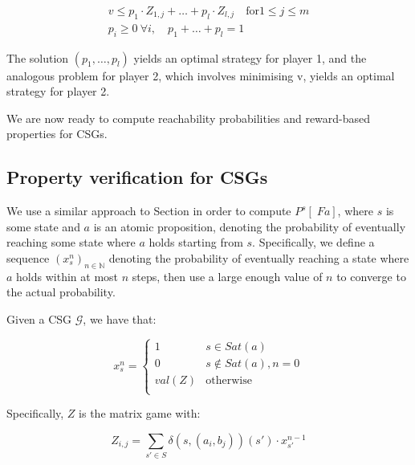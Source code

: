 \begin{align*}
v \leq p_1 \cdot Z_{1, j} + \dots + p_l \cdot Z_{l, j} \quad \text{for} 1 \leq j \leq m \\
p_i \geq 0 \: \forall i, \quad p_1 + \dots + p_l = 1
\end{align*}

The solution $(p_1, \dots, p_l)$ yields an optimal strategy for player 1, and the analogous problem for player 2, which involves minimising v, yields an optimal strategy for player 2.

We are now ready to compute reachability probabilities and reward-based properties for CSGs.

\subsection{Property verification for CSGs}
\label{cs3:prop_ver_csgs}

We use a similar approach to Section \label{cs1:prob_reach_mdps} in order to compute $P^{s}[ \; F a]$, where $s$ is some state and $a$ is an atomic proposition, denoting the probability of eventually reaching some state where $a$ holds starting from $s$. Specifically, we define a sequence $(x_s^{n})_{n \in \mathbb{N}}$ denoting the probability of eventually reaching a state where $a$ holds within at most $n$ steps, then use a large enough value of $n$ to converge to the actual probability.

\begin{definition}
    \label{cs1:val_iter_csgs}

    Given a CSG $\mathcal{G}$, we have that:

    \begin{equation*}
    x_s^{n} =
    \begin{cases}
    1 & s \in Sat(a) \\
    0 & s \notin Sat(a), n=0 \\
    val(Z) & \text{otherwise} \\
    \end{cases}
    \end{equation*}

    Specifically, $Z$ is the matrix game with:

    \begin{equation*}
        Z_{i,j} = \sum_{s' \in S} \delta(s, (a_{i}, b_{j}))(s') \cdot x_{s'}^{n-1}
    \end{equation*}

\end{definition}

